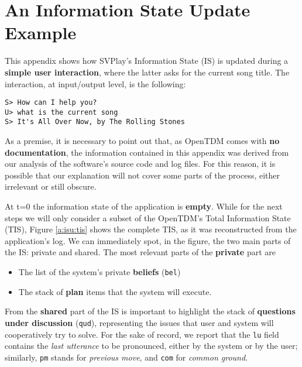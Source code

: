 
\chapter{An Information State Update Example} %

\label{a:isu} %


This appendix shows how SVPlay's Information State (IS) is updated during a \textbf{simple user interaction}, where the latter asks for the current song title. The interaction, at input/output level, is the following:
\begin{verbatim}
S> How can I help you?
U> what is the current song  
S> It's All Over Now, by The Rolling Stones
\end{verbatim}

As a premise, it is necessary to point out that, as OpenTDM comes with \textbf{no documentation}, the information contained in this appendix was derived from our analysis of the software's source code and log files. For this reason, it is possible that our explanation will not cover some parts of the process, either irrelevant or still obscure.

At t=0 the information state of the application is \textbf{empty}. While for the next steps we will only consider a subset of the OpenTDM's Total Information State (TIS), Figure \ref{a:isu:tis} shows the complete TIS, as it was reconstructed from the application's log. We can immediately spot, in the figure, the two main parts of the IS: private and shared. The most relevant parts of the \textbf{private} part are
\begin{itemize}
	\item The list of the system's private \textbf{beliefs} (\texttt{bel})
	\item The stack of \textbf{plan} items that the system will execute.
\end{itemize}

From the \textbf{shared} part of the IS is important to highlight the stack of \textbf{questions under discussion} (\texttt{qud}), representing the issues that user and system will cooperatively try to solve. For the sake of record, we report that the \texttt{lu} field contains the \textit{last utterance} to be pronounced, either by the system or by the user; similarly, \texttt{pm} stands for \textit{previous move}, and \texttt{com} for \textit{common ground}.

